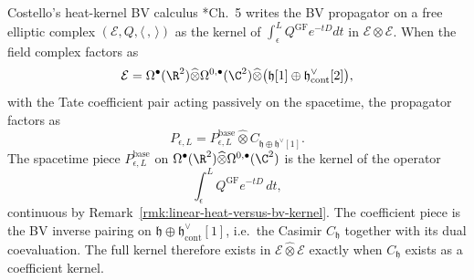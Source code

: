 \begin{rmk}\label{rmk:costello-coefficient-requirements}
  Costello's heat-kernel BV calculus
  \cite{costello-renormalization}*{Ch.~5} writes the BV propagator on a
  free elliptic complex $(\mathcal E,Q,\langle\,,\,\rangle)$ as the kernel
  of $\int_\epsilon^L Q^{\mathrm{GF}}e^{-tD}dt$ in
  $\mathcal E\widehat\otimes\mathcal E$. When the field complex factors as
  \begin{equation}\label{eq:wt-field-factor}
    \mathcal E=\Omega^\bullet(\R^2)\widehat\otimes
      \Omega^{0,\bullet}(\C^2)\widehat\otimes
      \bigl(\mathfrak h[1]
      \oplus\mathfrak h^\vee_{\mathrm{cont}}[2]\bigr),
  \end{equation}
  with the Tate coefficient pair acting passively on the spacetime, the
  propagator factors as
  \begin{equation}\label{eq:wt-propagator-factor}
    P_{\epsilon,L}=P_{\epsilon,L}^{\mathrm{base}}\widehat\otimes
      C_{\mathfrak h\oplus\mathfrak h^\vee[1]}.
  \end{equation}
  The spacetime piece $P_{\epsilon,L}^{\mathrm{base}}$ on
  $\Omega^\bullet(\R^2)\widehat\otimes\Omega^{0,\bullet}(\C^2)$ is the
  kernel of the operator
  \[
    \int_\epsilon^L Q^{\mathrm{GF}}e^{-tD}\,dt,
  \]
  continuous by Remark~\ref{rmk:linear-heat-versus-bv-kernel}. The
  coefficient piece is the BV inverse pairing on
  $\mathfrak h\oplus\mathfrak h^\vee_{\mathrm{cont}}[1]$,
  i.e.\ the Casimir $C_{\mathfrak h}$ together with its dual
  coevaluation. The full kernel therefore exists in
  $\mathcal E\widehat\otimes\mathcal E$ exactly when $C_{\mathfrak h}$
  exists as a coefficient kernel.


\end{rmk}
